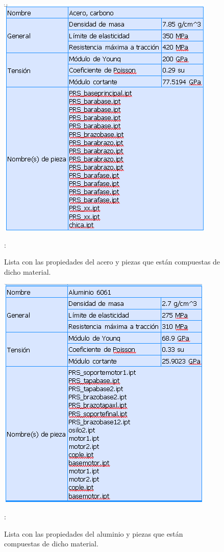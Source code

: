 \documentclass[11pt,a4paper,oldfontcommands,oneside]{memoir}
\begin{document}
\begin{flushleft}
\begin{figure}
\begin{center}
\includegraphics[scale=.85]{acero2.png}
\end{center}
\caption{Lista con las propiedades del acero y piezas que están compuestas de dicho material.}
\label{tabla5}:
\end{figure}

\begin{figure}
\begin{center}
\includegraphics[scale=.85]{aluminio2.png}
\end{center}
\caption{Lista con las propiedades del aluminio y piezas que están compuestas de dicho material.}
\label{tabla6}:
\end{figure}

\end{flushleft}
\end{document}
